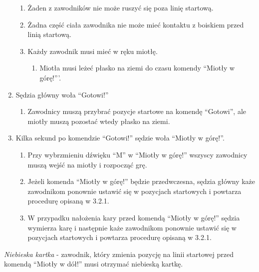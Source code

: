 \documentclass[12pt]{article}
\begin{document}
\begin{enumerate}
	      \begin{enumerate}
		      \item
		            Żaden z zawodników nie może ruszyć się poza linię startową.
		      \item
		            Żadna część ciała zawodnika nie może mieć kontaktu z boiskiem przed
		            linią startową.
		      \item
		            Każdy zawodnik musi mieć w ręku miotłę.

		            \begin{enumerate}
			            \item
			                  Miotła musi leżeć płasko na ziemi do czasu komendy ``Miotły w
			                  górę!'''.
		            \end{enumerate}
	      \end{enumerate}
	\item
	      Sędzia główny woła ``Gotowi!''

	      \begin{enumerate}
		      \item
		            Zawodnicy muszą przybrać pozycje startowe na komendę ``Gotowi'', ale
		            miotły muszą pozostać wtedy płasko na ziemi.
	      \end{enumerate}
	\item
	      Kilka sekund po komendzie ``Gotowi!'' sędzie woła ``Miotły w górę!''.

	      \begin{enumerate}
		      \item
		            Przy wybrzmieniu dźwięku ``M'' w ``Miotły w górę!'' wszyscy
		            zawodnicy muszą wejść na miotły i rozpocząć grę.
		      \item
		            Jeżeli komenda ``Miotły w górę!'' będzie przedwczesna, sędzia główny
		            każe zawodnikom ponownie ustawić się w pozycjach startowych i
		            powtarza procedurę opisaną w 3.2.1.
		      \item
		            W przypadku nałożenia kary przed komendą ``Miotły w górę!'' sędzia
		            wymierza karę i następnie każe zawodnikom ponownie ustawić się w
		            pozycjach startowych i powtarza procedurę opisaną w 3.2.1.
	      \end{enumerate}
\end{enumerate}

\emph{Niebieska kartka} - zawodnik, który zmienia pozycję na linii
startowej przed komendą ``Miotły w dół!'' musi otrzymać niebieską
kartkę.
\end{document}
